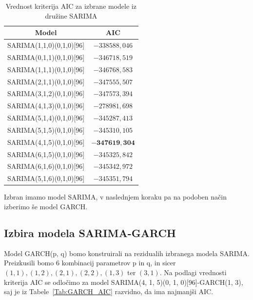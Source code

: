 \documentclass[a4paper, 11pt]{article}
\begin{document}
\begin{table}[!ht]
    \centering
    \caption{Vrednost kriterija AIC za izbrane modele iz družine SARIMA}\par\medskip
    \label{Tab:SARIMA_AIC}
    \begin{tabular}{c|c}
        Model & AIC \\ \hline
        SARIMA(1,1,0)(0,1,0)[96] & $-338588{,}046$ \\ 
        SARIMA(0,1,1)(0,1,0)[96] & $-346718{,}519$ \\ 
        SARIMA(1,1,1)(0,1,0)[96] & $-346768{,}583$ \\ 
        SARIMA(2,1,1)(0,1,0)[96] & $-347555{,}507$ \\ 
        SARIMA(3,1,2)(0,1,0)[96] & $-347573{,}394$ \\ 
        SARIMA(4,1,3)(0,1,0)[96] & $-278981{,}698$ \\ 
        SARIMA(5,1,4)(0,1,0)[96] & $-345287{,}413$ \\ 
        SARIMA(5,1,5)(0,1,0)[96] & $-345310{,}105$ \\ 
        SARIMA(4,1,5)(0,1,0)[96] & $\mathbf{-347619{,}304}$ \\ 
        SARIMA(6,1,5)(0,1,0)[96] & $-345325{,}842$ \\ 
        SARIMA(6,1,6)(0,1,0)[96] & $-345342{,}972$ \\ 
        SARIMA(5,1,6)(0,1,0)[96] & $-345351{,}794$ \\
    \end{tabular}
\end{table}

\noindent Izbran imamo model SARIMA, v naslednjem koraku pa na podoben način izberimo še model GARCH. 


\subsection{Izbira modela SARIMA-GARCH}

Model GARCH(p, q) bomo konstruirali na rezidualih izbranega modela SARIMA. Preizkusili bomo $6$ kombinacij 
parametrov p in q, in sicer $(1,1), (1,2), (2,1), (2,2), (1,3)$ ter $(3,1)$. 
Na podlagi vrednosti kriterija AIC se odločimo za model SARIMA(4, 1, 5)(0, 1, 0)[96]-GARCH(1, 3), saj
je iz Tabele~\ref{Tab:GARCH_AIC} razvidno, da ima najmanjši AIC. 
\end{document}
